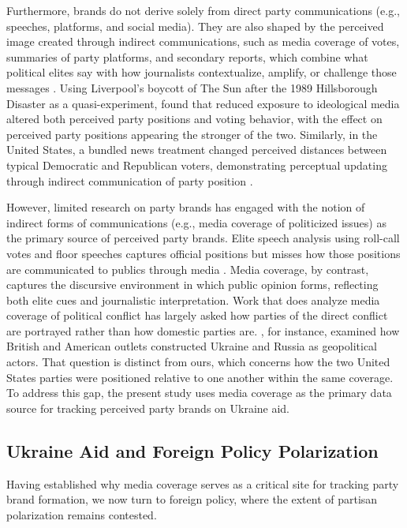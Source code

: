 Furthermore, brands do not derive solely from direct party communications (e.g., speeches, platforms, and social media). They are also shaped by the perceived image created through indirect communications, such as media coverage of votes, summaries of party platforms, and secondary reports, which combine what political elites say with how journalists contextualize, amplify, or challenge those messages \citep{karlbergPartisanBrandingMedia2002}. Using Liverpool's boycott of The Sun after the 1989 Hillsborough Disaster as a quasi-experiment, \citet{dasilvaMediaInfluenceSpatial2026} found that reduced exposure to ideological media altered both perceived party positions and voting behavior, with the effect on perceived party positions appearing the stronger of the two. Similarly, in the United States, a bundled news treatment changed perceived distances between typical Democratic and Republican voters, demonstrating perceptual updating through indirect communication of party position \citep{levenduskyDoesMediaCoverage2016}.

However, limited research on party brands has engaged with the notion of indirect forms of communications (e.g., media coverage of politicized issues) as the primary source of perceived party brands. Elite speech analysis using roll-call votes and floor speeches captures official positions but misses how those positions are communicated to publics through media \citep{grimmerTextDataPromise2013}. Media coverage, by contrast, captures the discursive environment in which public opinion forms, reflecting both elite cues and journalistic interpretation. Work that does analyze media coverage of political conflict has largely asked how parties of the direct conflict are portrayed rather than how domestic parties are. \citet{pavlichenkoPolarizationMediaPolitical2022}, for instance, examined how British and American outlets constructed Ukraine and Russia as geopolitical actors. That question is distinct from ours, which concerns how the two United States parties were positioned relative to one another within the same coverage. To address this gap, the present study uses media coverage as the primary data source for tracking perceived party brands on Ukraine aid.

\subsection{Ukraine Aid and Foreign Policy Polarization}

Having established why media coverage serves as a critical site for tracking party brand formation, we now turn to foreign policy, where the extent of partisan polarization remains contested.

